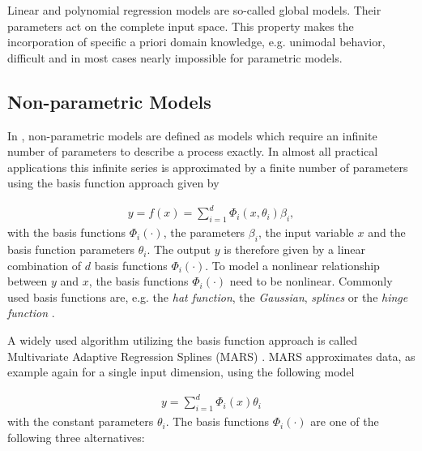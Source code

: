 Linear and polynomial regression models are so-called global models. Their parameters act on the complete input space. This property makes the incorporation of specific a priori domain knowledge, e.g. unimodal behavior, difficult and in most cases nearly impossible for parametric models. 

\subsection{Non-parametric Models}

In \cite{nelles2013nonlinear}, non-parametric models are defined as models which require an infinite number of parameters to describe a process exactly. In almost all practical applications this infinite series is approximated by a finite number of parameters using the basis function approach given by

\begin{align} \label{eq:basis-function-approach}
	y = f(x) = \sum_{i=1}^d \Phi_i(x, \theta_i) \beta_i,
\end{align} 
%
with the basis functions $\Phi_i(\cdot)$, the parameters $\beta_i$, the input variable $x$ and the basis function parameters $\theta_i$. The output $y$ is therefore given by a linear combination of $d$ basis functions $\Phi_i(\cdot)$. To model a nonlinear relationship between $y$ and $x$, the basis functions $\Phi_i(\cdot)$ need to be nonlinear. Commonly used basis functions are, e.g. the \emph{hat function}, the \emph{Gaussian}, \emph{splines} or the \emph{hinge function} \cite{friedman2001elements}. 

A widely used algorithm utilizing the basis function approach is called Multivariate Adaptive Regression Splines (MARS) \cite{friedman1991multivariate}. MARS approximates data, as example again for a single input dimension, using the following model

\begin{align} \label{eq:MARS}
	y = \sum_{i=1}^d \Phi_i(x) \theta_i
\end{align}
%
with the constant parameters $\theta_i$. The basis functions $\Phi_i(\cdot)$ are one of the following three alternatives:

